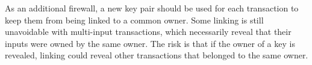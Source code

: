 \documentclass{article}
\begin{document}


As an additional firewall, a new key pair should be used for each transaction to keep them from being linked to a common
owner.
Some linking is still unavoidable with multi-input transactions,
which necessarily reveal that their inputs were owned by the same owner.
The risk is that if the owner of a key is revealed,
linking could reveal other transactions that belonged to the same owner.
\end{document}
